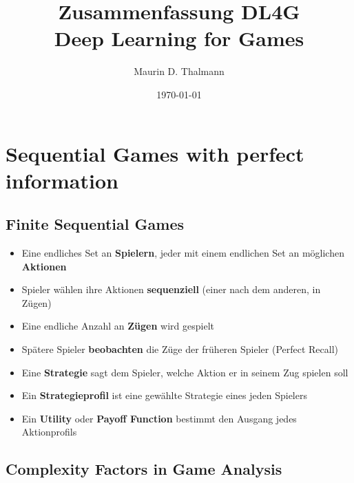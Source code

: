 \documentclass[a4paper]{article}
\title{\textbf{Zusammenfassung DL4G} \\
		Deep Learning for Games}
\date{\today}
\author{Maurin D. Thalmann}
\begin{document}
	
	\maketitle
	
	\newpage
	\tableofcontents
	
	\newpage
	
	\section{Sequential Games with perfect information}
	
		\subsection{Finite Sequential Games}
		
		\begin{itemize}
			\item Eine endliches Set an \textbf{Spielern}, jeder mit einem endlichen Set an möglichen \textbf{Aktionen}
			\item Spieler wählen ihre Aktionen \textbf{sequenziell} (einer nach dem anderen, in Zügen)
			\item Eine endliche Anzahl an \textbf{Zügen} wird gespielt
			\item Spätere Spieler \textbf{beobachten} die Züge der früheren Spieler (Perfect Recall)
			\item Eine \textbf{Strategie} sagt dem Spieler, welche Aktion er in seinem Zug spielen soll
			\item Ein \textbf{Strategieprofil} ist eine gewählte Strategie eines jeden Spielers
			\item Ein \textbf{Utility} oder \textbf{Payoff Function} bestimmt den Ausgang jedes Aktionprofils
		\end{itemize}
	
		\subsection{Complexity Factors in Game Analysis}
		
\end{document}
